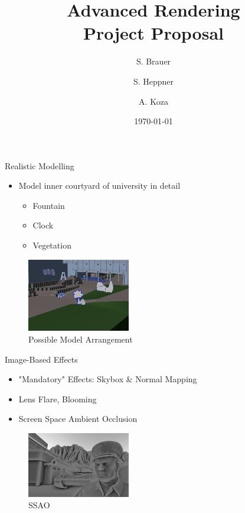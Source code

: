 \documentclass{beamer}
\title[Project Proposal]{Advanced Rendering \\ Project Proposal}
\author[Brauer, Heppner, Koza]
{S. Brauer \and S. Heppner \and A. Koza}
\institute[University of Paderborn]{Institute for Computer Science}
\date{\today}
\begin{document}
\begin{frame}
  \titlepage
\end{frame}

\begin{frame}{Realistic Modelling}
\begin{minipage}[hbt]{0.45\textwidth}
	\begin{itemize}
		\item Model inner courtyard of university in detail
		\begin{itemize}
			\item Fountain
			\item Clock
			\item Vegetation
		\end{itemize}
	\end{itemize}	
\end{minipage}
\begin{minipage}[hbt]{0.45\textwidth}
	\begin{figure}
	\centering
	\includegraphics[width=4.5cm]{figures/models.png}
	\caption{Possible Model Arrangement}
	\end{figure}
\end{minipage}
\end{frame}

\begin{frame}{Image-Based Effects}
\begin{minipage}[hbt]{0.45\textwidth}
	\begin{itemize}
		\item "Mandatory" Effects: Skybox \& Normal Mapping
		\item Lens Flare, Blooming
		\item Screen Space Ambient Occlusion
	\end{itemize}	
\end{minipage}
\begin{minipage}[hbt]{0.45\textwidth}
	\begin{figure}
	\centering
	\includegraphics[width=4.5cm]{figures/ssao.jpg}
	\caption{SSAO}
	\end{figure}
\end{minipage}
\end{frame}
\end{document}
